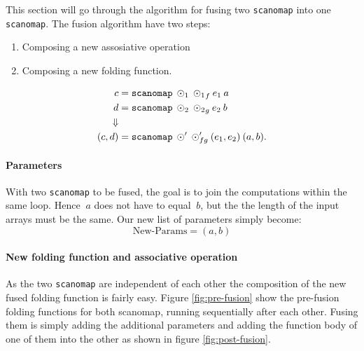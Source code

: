 \documentclass[11pt]{article}
\begin{document}
This section will go through the algorithm for fusing two \texttt{scanomap} into one \texttt{scanomap}. The fusion algorithm have two steps:
\begin{enumerate}
\item Composing a new assosiative operation
\item Composing a new folding function.
\end{enumerate}

\begin{align*}
  c &= \mathtt{scanomap} \: \odot_1 \: {\odot_1}_f \: e_1 \: a \\
  d &= \mathtt{scanomap} \: \odot_2 \: {\odot_2}_g \: e_2 \: b \\
\Downarrow \\
  (c,d) &= \mathtt{scanomap} \: \odot' \: \odot'_{fg} \: (e_1, e_2) \: (a, b)\mathnormal{.}
\end{align*}


\paragraph{Parameters} With two \texttt{scanomap} to be fused, the goal is to join the computations within the same loop. Hence $\: a$ does not have to equal $\: b$, but the the length of the input arrays must be the same. Our new list of parameters simply become:
$$\text{New-Params} = (a,b)$$

\paragraph{New folding function and associative operation} As the two \texttt{scanomap} are independent of each other the composition of the new fused folding function is fairly easy. Figure \ref{fig:pre-fusion} show the pre-fusion folding functions for both scanomap, running sequentially after each other. Fusing them is simply adding the additional parameters and adding the function body of one of them into the other as shown in figure \ref{fig:post-fusion}. 
\end{document}
